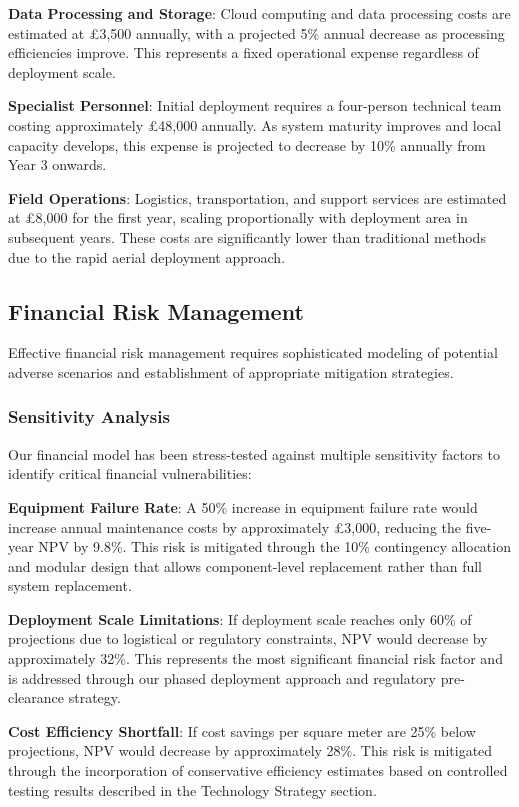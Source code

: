 \textbf{Data Processing and Storage}: Cloud computing and data processing costs are estimated at \pounds 3,500 annually, with a projected 5\% annual decrease as processing efficiencies improve. This represents a fixed operational expense regardless of deployment scale.

\textbf{Specialist Personnel}: Initial deployment requires a four-person technical team costing approximately \pounds 48,000 annually. As system maturity improves and local capacity develops, this expense is projected to decrease by 10\% annually from Year 3 onwards.

\textbf{Field Operations}: Logistics, transportation, and support services are estimated at \pounds 8,000 for the first year, scaling proportionally with deployment area in subsequent years. These costs are significantly lower than traditional methods due to the rapid aerial deployment approach.


\subsection{Financial Risk Management}
Effective financial risk management requires sophisticated modeling of potential adverse scenarios and establishment of appropriate mitigation strategies.

\subsubsection{Sensitivity Analysis}
Our financial model has been stress-tested against multiple sensitivity factors to identify critical financial vulnerabilities:

\textbf{Equipment Failure Rate}: A 50\% increase in equipment failure rate would increase annual maintenance costs by approximately \pounds 3,000, reducing the five-year NPV by 9.8\%. This risk is mitigated through the 10\% contingency allocation and modular design that allows component-level replacement rather than full system replacement.

\textbf{Deployment Scale Limitations}: If deployment scale reaches only 60\% of projections due to logistical or regulatory constraints, NPV would decrease by approximately 32\%. This represents the most significant financial risk factor and is addressed through our phased deployment approach and regulatory pre-clearance strategy.

\textbf{Cost Efficiency Shortfall}: If cost savings per square meter are 25\% below projections, NPV would decrease by approximately 28\%. This risk is mitigated through the incorporation of conservative efficiency estimates based on controlled testing results described in the Technology Strategy section.

